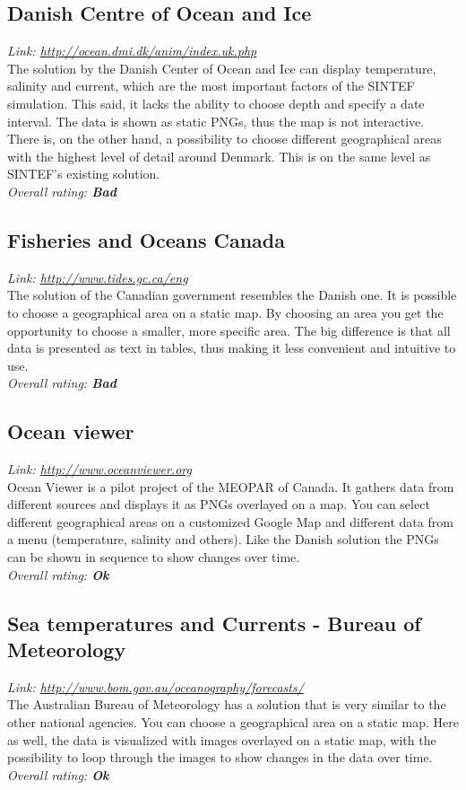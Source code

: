 \documentclass[11pt,a4paper,titlepage,oneside]{report}
\begin{document}
\subsection{Danish Centre of Ocean and Ice}
  \emph{Link: \url{http://ocean.dmi.dk/anim/index.uk.php }} \\%
    The solution by the Danish Center of Ocean and Ice can display temperature, salinity and current, which are the most important factors of the SINTEF simulation. This said, it lacks the ability to choose depth and specify a date interval. The data is shown as static PNGs, thus the map is not interactive. There is, on the other hand, a possibility to choose different geographical areas with the highest level of detail around Denmark. This is on the same level as SINTEF's existing solution.
  \\ \emph{Overall rating: \textbf{Bad}}

  \subsection{Fisheries and Oceans Canada}
  \emph{Link: \url{http://www.tides.gc.ca/eng}} \\%
    The solution of the Canadian government resembles the Danish one. It is possible to choose a geographical area on a static map. By choosing an area you get the opportunity to choose a smaller, more specific area. The big difference is that all data is presented as text in tables, thus making it less convenient and intuitive to use.
  \\ \emph{Overall rating: \textbf{Bad}}

  \subsection{Ocean viewer}
  \emph{Link: \url{http://www.oceanviewer.org}} \\%
    Ocean Viewer is a pilot project of the \gls{MEOPAR} of Canada. It gathers data from different sources and displays it as PNGs overlayed on a map. You can select different geographical areas on a customized Google Map and different data from a menu (temperature, salinity and others). Like the Danish solution the PNGs can be shown in sequence to show changes over time.
  \\ \emph{Overall rating: \textbf{Ok}}

  \subsection{Sea temperatures and Currents - Bureau of Meteorology}
  \emph{Link: \url{http://www.bom.gov.au/oceanography/forecasts/}} \\%
    The Australian Bureau of Meteorology has a solution that is very similar to the other national agencies. You can choose a geographical area on a static map. Here as well, the data is visualized with images overlayed on a static map, with the possibility to loop through the images to show changes in the data over time.
  \\ \emph{Overall rating: \textbf{Ok}}
  
\end{document}
